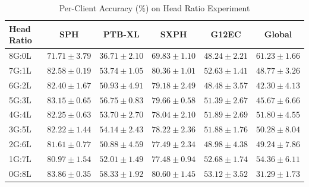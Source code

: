 \documentclass[a4paper]{article}
\begin{document}
\begin{table}[htbp]
  \centering
  \caption{Per-Client Accuracy (\%) on Head Ratio Experiment}
  \begin{tabular}{l|cccc|c}
    \toprule
    Head Ratio & SPH & PTB-XL & SXPH & G12EC & Global \\
    \midrule
    8G:0L & $71.71 \pm 3.79$ & $36.71 \pm 2.10$ & $69.83 \pm 1.10$ & $48.24 \pm 2.21$ & \textbf{$61.23 \pm 1.66$} \\
    7G:1L & $82.58 \pm 0.19$ & $53.74 \pm 1.05$ & $80.36 \pm 1.01$ & $52.63 \pm 1.41$ & $48.77 \pm 3.26$ \\
    6G:2L & $82.40 \pm 1.67$ & $50.93 \pm 4.91$ & $79.18 \pm 2.49$ & $48.48 \pm 3.57$ & $42.30 \pm 4.13$ \\
    5G:3L & $83.15 \pm 0.65$ & $56.75 \pm 0.83$ & $79.66 \pm 0.58$ & $51.39 \pm 2.67$ & $45.67 \pm 6.66$ \\
    4G:4L & $82.25 \pm 0.63$ & $53.70 \pm 2.70$ & $78.04 \pm 2.10$ & $51.89 \pm 2.69$ & $51.80 \pm 4.55$ \\
    3G:5L & $82.22 \pm 1.44$ & $54.14 \pm 2.43$ & $78.22 \pm 2.36$ & $51.88 \pm 1.76$ & $50.28 \pm 8.04$ \\
    2G:6L & $81.61 \pm 0.77$ & $50.88 \pm 4.59$ & $77.49 \pm 2.34$ & $48.98 \pm 4.38$ & $49.24 \pm 7.86$ \\
    1G:7L & $80.97 \pm 1.54$ & $52.01 \pm 1.49$ & $77.48 \pm 0.94$ & $52.68 \pm 1.74$ & $54.36 \pm 6.11$ \\
    0G:8L & \textbf{$83.86 \pm 0.35$} & \textbf{$58.33 \pm 1.92$} & \textbf{$80.60 \pm 1.45$} & \textbf{$53.12 \pm 3.52$} & $31.29 \pm 1.73$ \\
    \bottomrule
  \end{tabular}
\end{table}
\clearpage
\end{document}
